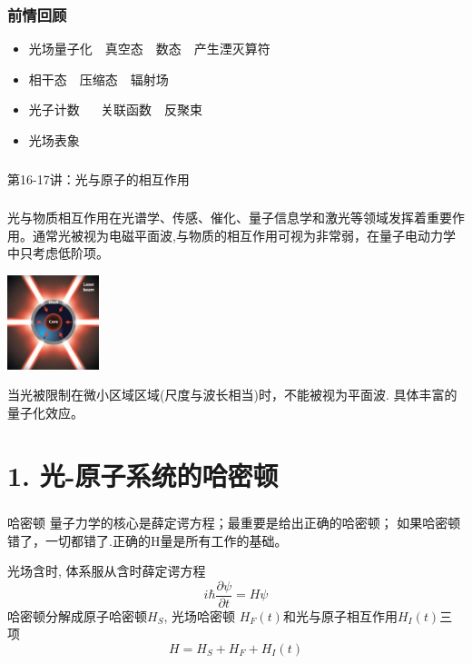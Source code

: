 \begin{frame}
    \frametitle{前情回顾}
    \begin{itemize}
        \item 光场量子化~~真空态~~数态~~产生湮灭算符 
        \item 相干态~~压缩态~~辐射场 
        \item 光子计数 ~~ 关联函数~~反聚束
        \item 光场表象
    \end{itemize}     
\end{frame}

\begin{frame} [plain]
    \frametitle{}
    \Background[1] 
    \begin{center}
    {\huge 第16-17讲：光与原子的相互作用}
    \end{center}  
    \addtocounter{framenumber}{-1}   
\end{frame}



\begin{frame} 
\frametitle{}
{\Bullet}光与物质相互作用在光谱学、传感、催化、量子信息学和激光等领域发挥着重要作用。通常光被视为电磁平面波,与物质的相互作用可视为非常弱，在量子电动力学中只考虑低阶项。\\
  \begin{center}
       \includegraphics[width=0.2\textwidth]{figs/23.png}
  \end{center}
{\Bullet}当光被限制在微小区域区域(尺度与波长相当)时，不能被视为平面波. 具体丰富的量子化效应。
\end{frame}

\section{1. 光-原子系统的哈密顿}

\begin{frame} 
 \frametitle{}
 \begin{tcolorbox2}[1.0]{哈密顿}
    量子力学的核心是薛定谔方程；最重要是给出正确的哈密顿； 如果哈密顿错了，一切都错了.正确的H量是所有工作的基础。
  \end{tcolorbox2}
 光场含时, 体系服从含时薛定谔方程
      \[ i \hbar \frac{\partial \psi}{\partial t} = H \psi \]
      哈密顿分解成原子哈密顿$H_S$, 光场哈密顿 $H_F(t)$和光与原子相互作用$H_I(t)$三项
      \[H= H_S+H_F+H_I(t) \]
\end{frame}

